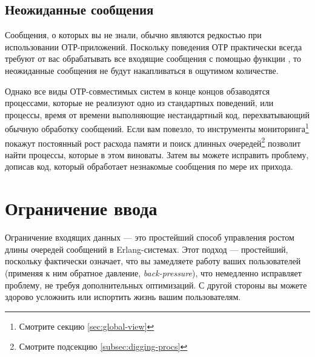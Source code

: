 \documentclass[11pt, oneside]{book}   	%
\begin{document}
\subsection{Неожиданные сообщения}

Сообщения, о которых вы не знали, обычно являются редкостью при использовании ОТР-приложений. Поскольку поведения ОТР практически всегда требуют от вас обрабатывать все входящие сообщения с помощью функции , то неожиданные сообщения не будут накапливаться в ощутимом количестве.

Однако все виды ОТР-совместимых систем в конце концов обзаводятся процессами, которые не реализуют одно из стандартных поведений, или процессы, время от времени выполняющие нестандартный код, перехватывающий обычную обработку сообщений. Если вам повезло, то инструменты мониторинга\footnote{Смотрите секцию \ref{sec:global-view}} покажут постоянный рост расхода памяти и поиск длинных очередей\footnote{Смотрите подсекцию \ref{subsec:digging-procs}} позволит найти процессы, которые в этом виноваты. Затем вы можете исправить проблему, дописав код, который обработает незнакомые сообщения по мере их прихода.


\section{Ограничение ввода}

Ограничение входящих данных --- это простейший способ управления ростом длины очередей сообщений в Erlang-системах. Этот подход --- простейший, поскольку фактически означает, что вы замедляете работу ваших пользователей (применяя к ним обратное давление, \emph{back-pressure}), что немедленно исправляет проблему, не требуя дополнительных оптимизаций. С другой стороны вы можете здорово усложнить или испортить жизнь вашим пользователям.
\end{document}
